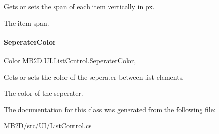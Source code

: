 Gets or sets the span of each item vertically in px. 

The item span.\hypertarget{class_m_b2_d_1_1_u_i_1_1_list_control_ac5c3ad4a524d48a490f7e4bfa088c0e1}{}\label{class_m_b2_d_1_1_u_i_1_1_list_control_ac5c3ad4a524d48a490f7e4bfa088c0e1} 
\paragraph{\texorpdfstring{Seperater\+Color}{SeperaterColor}}
{\footnotesize\ttfamily Color M\+B2\+D.\+U\+I.\+List\+Control.\+Seperater\+Color\hspace{0.3cm}{\ttfamily [get]}, {\ttfamily [set]}}



Gets or sets the color of the seperater between list elements. 

The color of the seperater.

The documentation for this class was generated from the following file\+:\begin{DoxyCompactItemize}
\item 
M\+B2\+D/src/\+U\+I/List\+Control.\+cs\end{DoxyCompactItemize}

